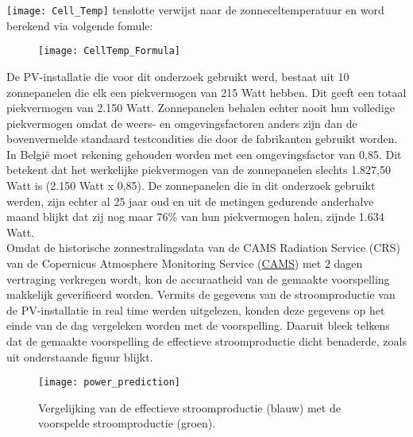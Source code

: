 \texttt{[image: Cell\_Temp]} tenslotte verwijst naar de zonneceltemperatuur en word berekend via volgende fomule:

\begin{figure}[h!]
    \centering\texttt{[image: CellTemp\_Formula]}
\end{figure} 

De PV-installatie die voor dit onderzoek gebruikt werd, bestaat uit 10 zonnepanelen die elk een piekvermogen van 215 Watt hebben. Dit geeft een totaal piekvermogen van 2.150 Watt. Zonnepanelen behalen echter nooit hun volledige piekvermogen omdat de weers- en omgevingsfactoren anders zijn dan de bovenvermelde standaard testcondities die door de fabrikanten gebruikt worden. In België moet rekening gehouden worden met een omgevingsfactor van 0,85. Dit betekent dat het werkelijke piekvermogen van de zonnepanelen slechts 1.827,50 Watt is (2.150 Watt x 0,85). De zonnepanelen die in dit onderzoek gebruikt werden, zijn echter al 25 jaar oud en uit de metingen gedurende anderhalve maand blijkt dat zij nog maar 76\% van hun piekvermogen halen, zijnde 1.634 Watt. \\

Omdat de historische zonnestralingsdata van de CAMS Radiation Service (CRS) van de Copernicus Atmosphere Monitoring Service (\href{https://atmosphere.copernicus.eu}{CAMS}) met 2 dagen vertraging verkregen wordt, kon de accuraatheid van de gemaakte voorspelling makkelijk geverifieerd worden. Vermits de gegevens van de stroomproductie van de PV-installatie in real time werden uitgelezen, konden deze gegevens op het einde van de dag vergeleken worden met de voorspelling. Daaruit bleek telkens dat de gemaakte voorspelling de effectieve stroomproductie dicht benaderde, zoals uit onderstaande figuur blijkt.

\begin{figure}[h!]
    \centering\texttt{[image: power\_prediction]}
    \caption{\label{fig:power_prediction}Vergelijking van de effectieve stroomproductie (blauw) met de voorspelde stroomproductie (groen).}
\end{figure} 

\subsection{}%
\label{sec:Weergave uitgelezen data en voorspelling met een iOS app}

